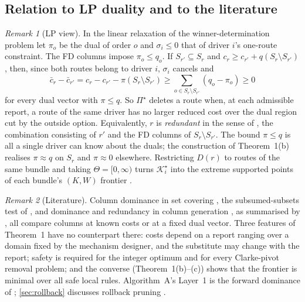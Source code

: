 \documentclass[11pt]{article}
\theoremstyle{definition}
\theoremstyle{remark}
\newtheorem{remark}{Remark}
\newcommand{\Ks}{\mathcal{K}^{\star}}
\begin{document}
\subsection{Relation to LP duality and to the literature}

\begin{remark}[LP view]\label{rem:lp}
In the linear relaxation of the winner-determination problem let $\pi_o$ be
the dual of order $o$ and $\sigma_i\le0$ that of driver $i$'s
one-route constraint. The FD columns impose $\pi_o\le q_o$. If
$S_{r'}\subseteq S_r$ and $c_r\ge c_{r'}+q(S_r\setminus S_{r'})$, then, since
both routes belong to driver $i$, $\sigma_i$ cancels and
\[
\bar c_r-\bar c_{r'}=c_r-c_{r'}-\pi(S_r\setminus S_{r'})
\ge\sum_{o\in S_r\setminus S_{r'}}(q_o-\pi_o)\ge0
\]
for every dual vector with $\pi\le q$. So $\Pi^\star$ deletes a route when, at
each admissible report, a route of the same driver has no larger reduced cost
over the dual region cut by the outside option. Equivalently, $r$ is
\emph{redundant} in the sense of \citet{sol1994column}, the combination
consisting of $r'$ and the FD columns of $S_r\setminus S_{r'}$. The bound
$\pi\le q$ is all a single driver can know about the duals; the construction of
Theorem~1(b) realises $\pi\approx q$ on $S_r$ and $\pi\approx0$ elsewhere.
Restricting $D(r)$ to routes of the same bundle and taking $\Theta=[0,\infty)$
turns $\Ks_i$ into the extreme supported points of each bundle's $(K,W)$
frontier \citep{ehrgott2005multicriteria}.
\end{remark}

\begin{remark}[Literature]\label{rem:lit}
Column dominance in set covering \citep{beasley1987algorithm}, the
subsumed-subsets test of \citet{muller1998solving}, and dominance and
redundancy in column generation \citep{vanderbeck1994thesis,sol1994column}, as
summarised by \citet{lubbecke2005selected}, all compare columns at known costs
or at a fixed dual vector. Three features of Theorem~1 have no counterpart
there: costs depend on a report ranging over a domain fixed by the mechanism
designer, and the substitute may change with the report; safety is required
for the integer optimum and for every Clarke-pivot removal problem; and the
converse (Theorem~1(b)--(c)) shows that the frontier is minimal over all safe
local rules. Algorithm~A's Layer~1 is the forward dominance of
\citet{dumas1991pickup}; \cref{sec:rollback} discusses rollback pruning
\citep{lozano2016exact}.
\end{remark}
\end{document}
